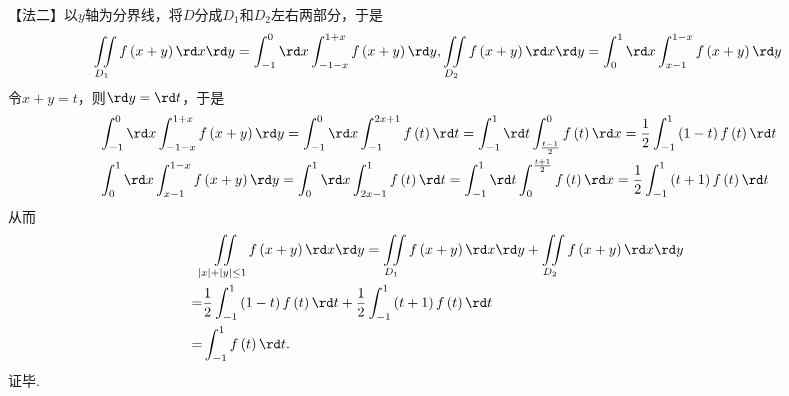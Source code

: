 {      【法二】以$y$轴为分界线，将$D$分成${{D}_{1}}$和${{D}_{2}}$左右两部分，于是
        $$\displaystyle\iint\limits_{{{D}_{1}}}{f\left( x+y \right)\rd x\rd y}=\displaystyle\int_{-1}^{0}{\rd x\displaystyle\int_{-1-x}^{1+x}{f\left( x+y \right)\rd y}},\displaystyle\iint\limits_{{{D}_{2}}}{f\left( x+y \right)\rd x\rd y}=\displaystyle\int_{0}^{1}{\rd x\displaystyle\int_{x-1}^{1-x}{f\left( x+y \right)\rd y}}$$
      令$x+y=t$，则$\rd y=\rd t$，于是
        \begin{align*}
        & \displaystyle\int_{-1}^{0}{\rd x\displaystyle\int_{-1-x}^{1+x}{f\left( x+y \right)\rd y}}=\displaystyle\int_{-1}^{0}{\rd x\displaystyle\int_{-1}^{2x+1}{f\left( t \right)\rd t}}=\displaystyle\int_{-1}^{1}{\rd t\displaystyle\int_{\frac{t-1}{2}}^{0}{f\left( t \right)\rd x}}=\dfrac{1}{2}\displaystyle\int_{-1}^{1}{\left( 1-t \right)f\left( t \right)\rd t} \\
        & \displaystyle\int_{0}^{1}{\rd x\displaystyle\int_{x-1}^{1-x}{f\left( x+y \right)\rd y}}=\displaystyle\int_{0}^{1}{\rd x\displaystyle\int_{2x-1}^{1}{f\left( t \right)\rd t}}=\displaystyle\int_{-1}^{1}{\rd t\displaystyle\int_{0}^{\frac{t+1}{2}}{f\left( t \right)\rd x}}=\dfrac{1}{2}\displaystyle\int_{-1}^{1}{\left( t+1 \right)f\left( t \right)\rd t}
      \end{align*}
      从而
      \begin{align*}
        & \displaystyle\iint\limits_{\left| x \right|+\left| y \right|\le 1}{f\left( x+y \right)\rd x\rd y}=\displaystyle\iint\limits_{{{D}_{1}}}{f\left( x+y \right)\rd x\rd y}+\displaystyle\iint\limits_{{{D}_{2}}}{f\left( x+y \right)\rd x\rd y} \\
        = & \dfrac{1}{2}\displaystyle\int_{-1}^{1}{\left( 1-t \right)f\left( t \right)\rd t}+\dfrac{1}{2}\displaystyle\int_{-1}^{1}{\left( t+1 \right)f\left( t \right)\rd t} \\
        = & \displaystyle\int_{-1}^{1}{f\left( t \right)\rd t}.
      \end{align*}
      证毕.
    }

